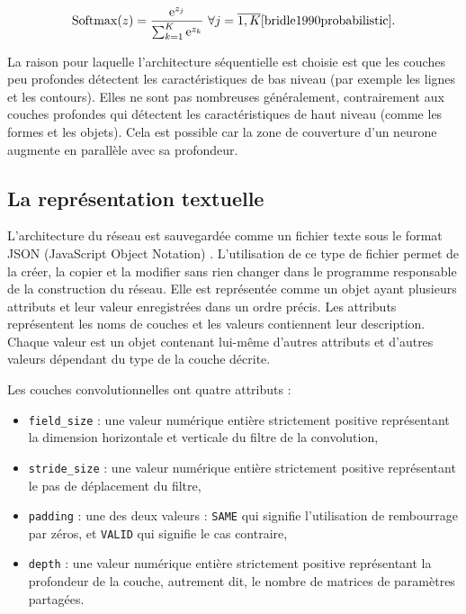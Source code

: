 $$
\mathrm{Softmax}(z) = \frac{\mathrm{e}^{z_j}}{\sum^K_{k=1}\mathrm{e}^{z_k}}~\forall{j=\overline{1,K}} \cite{bridle1990probabilistic}.
$$

La raison pour laquelle l'architecture séquentielle est choisie est que les
couches peu profondes détectent
les caractéristiques de bas niveau (par exemple les lignes et les contours). Elles
ne sont pas nombreuses généralement, contrairement aux couches profondes qui détectent
les caractéristiques de haut niveau (comme les formes et les objets).
Cela est possible car la zone de couverture d'un neurone
augmente en parallèle avec sa profondeur.\cite{michael2015neural,Goodfellow-et-al-2016}

\subsection{La représentation textuelle}

L'architecture du réseau est sauvegardée comme un fichier texte sous le format
JSON (JavaScript Object Notation) \cite{introducing2012ecma}.
L'utilisation de ce type de fichier
permet de la créer, la copier et la modifier sans rien changer dans le
programme responsable de la construction du réseau. Elle est représentée comme un objet
ayant plusieurs attributs et leur valeur enregistrées dans un ordre précis.
Les attributs représentent les noms de couches et les valeurs contiennent
leur description. Chaque valeur est un objet contenant lui-même d'autres attributs
et d'autres valeurs dépendant du type de la couche décrite.

Les couches convolutionnelles ont quatre attributs :

\begin{itemize}
  \item \texttt{field\_size} : une valeur numérique entière strictement positive
  représentant la dimension horizontale et verticale du filtre de la convolution,
  \item \texttt{stride\_size} : une valeur numérique entière strictement positive
  représentant le pas de déplacement du filtre,
  \item \texttt{padding} : une des deux valeurs : \texttt{SAME} qui signifie
  l'utilisation de rembourrage par zéros, et \texttt{VALID} qui signifie le cas
  contraire,
  \item \texttt{depth} : une valeur numérique entière strictement positive représentant
  la profondeur de la couche, autrement dit, le nombre de matrices de paramètres
  partagées.
\end{itemize}


